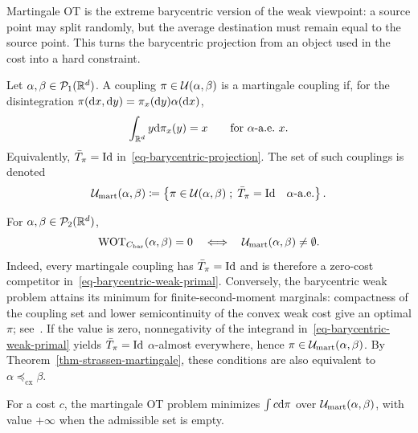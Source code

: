Martingale OT is the extreme barycentric version of the weak viewpoint: a source point may split randomly, but the average destination must remain equal to the source point. This turns the barycentric projection from an object used in the cost into a hard constraint.

\begin{defn}\label{def-martingale-coupling}
	Let $\alpha,\beta\in\mathcal{P}_1(\mathbb{R}^d)$. A coupling $\pi\in\mathcal{U}(\alpha,\beta)$ is a martingale coupling if, for the disintegration $\pi(\mathrm{d} x,\mathrm{d} y)=\pi_x(\mathrm{d} y)\alpha(\mathrm{d} x)$,
	\begin{equation}\label{eq-martingale-coupling}
		\int_{\mathbb{R}^d}y\mathrm{d}\pi_x(y)=x
		\qquad\text{for $\alpha$-a.e.\ }x.
	\end{equation}
	Equivalently, $\bar T_\pi=\mathrm{Id}$ in~\eqref{eq-barycentric-projection}. The set of such couplings is denoted
	\[
		\mathcal{U}_{\mathrm{mart}}(\alpha,\beta)
		\coloneqq
		\left\{ \pi\in\mathcal{U}(\alpha,\beta) \;;\; \bar T_\pi=\mathrm{Id}\quad\alpha\text{-a.e.} \right\}.
	\]
\end{defn}

\begin{rem}\label{rem-weak-ot-martingale-feasibility}
	For $\alpha,\beta\in\mathcal{P}_2(\mathbb{R}^d)$,
	\begin{equation}\label{eq-weak-zero-iff-martingale}
		\operatorname{WOT}_{C_{\mathrm{bar}}}(\alpha,\beta)=0
		\quad\Longleftrightarrow\quad
		\mathcal{U}_{\mathrm{mart}}(\alpha,\beta)\neq\emptyset.
	\end{equation}
	Indeed, every martingale coupling has $\bar T_\pi=\mathrm{Id}$ and is therefore a zero-cost competitor in~\eqref{eq-barycentric-weak-primal}. Conversely, the barycentric weak problem attains its minimum for finite-second-moment marginals: compactness of the coupling set and lower semicontinuity of the convex weak cost give an optimal $\pi$; see~\cite{backhoff2019weak}. If the value is zero, nonnegativity of the integrand in~\eqref{eq-barycentric-weak-primal} yields $\bar T_\pi=\mathrm{Id}$ $\alpha$-almost everywhere, hence $\pi\in\mathcal{U}_{\mathrm{mart}}(\alpha,\beta)$. By Theorem~\ref{thm-strassen-martingale}, these conditions are also equivalent to $\alpha\preceq_{\mathrm{cx}}\beta$.
\end{rem}

For a cost $c$, the martingale OT problem minimizes $\int c\mathrm{d}\pi$ over $\mathcal{U}_{\mathrm{mart}}(\alpha,\beta)$, with value $+\infty$ when the admissible set is empty.

